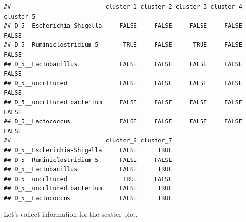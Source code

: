 \documentclass[
]{book}
\begin{document}
\begin{verbatim}
##                           cluster_1 cluster_2 cluster_3 cluster_4 cluster_5
## D_5__Escherichia-Shigella     FALSE     FALSE     FALSE     FALSE     FALSE
## D_5__Ruminiclostridium 5       TRUE     FALSE      TRUE     FALSE     FALSE
## D_5__Lactobacillus            FALSE     FALSE     FALSE     FALSE     FALSE
## D_5__uncultured               FALSE     FALSE     FALSE     FALSE     FALSE
## D_5__uncultured bacterium     FALSE     FALSE     FALSE     FALSE     FALSE
## D_5__Lactococcus              FALSE     FALSE     FALSE     FALSE     FALSE
##                           cluster_6 cluster_7
## D_5__Escherichia-Shigella     FALSE      TRUE
## D_5__Ruminiclostridium 5      FALSE     FALSE
## D_5__Lactobacillus            FALSE      TRUE
## D_5__uncultured                TRUE     FALSE
## D_5__uncultured bacterium     FALSE      TRUE
## D_5__Lactococcus              FALSE      TRUE
\end{verbatim}

Let's collect information for the scatter plot.
\end{document}
